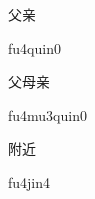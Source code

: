 \begin{multicols*}{2}
\begin{verbete}[fu4qin0]{父亲}
\begin{pronuncia}{fu4quin0}
\end{pronuncia}
\end{verbete}

\begin{verbete}[fu4mu3qin0]{父母亲}
\begin{pronuncia}{fu4mu3quin0}
\end{pronuncia}
\end{verbete}

\begin{verbete}[fu4jin4]{附近}
\begin{pronuncia}{fu4jin4}
\end{pronuncia}
\end{verbete}

\end{multicols*}

